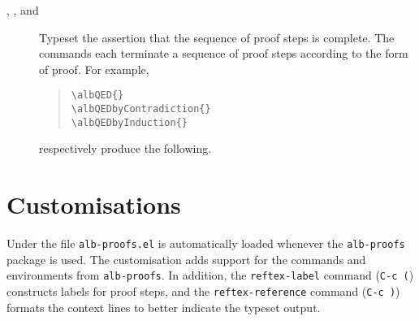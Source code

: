 \documentclass[11pt,a4paper,oneside,titlepage]{alb-latex}
\begin{document}
\begin{description}
\item[, , and
  ] Typeset the assertion that the sequence
  of proof steps is complete.  The commands each terminate a sequence of
  proof steps according to the form of proof.  For example,
  \begin{quote}
\begin{verbatim}
\albQED{}
\albQEDbyContradiction{}
\albQEDbyInduction{}
\end{verbatim}
  \end{quote}
  respectively produce the following.
  \begin{quote}
    \albQED{}
    \albQEDbyContradiction{}
    \albQEDbyInduction{}
  \end{quote}
\end{description}




\section{\AUCTeX{} Customisations}
\label{sec:alb-proofs-documentation:auctex-cust}

Under \AUCTeX{} the file \texttt{alb-proofs.el} is automatically loaded
whenever the \texttt{alb-proofs} package is used.  The customisation
adds support for the commands and environments from \texttt{alb-proofs}.
In addition, the \texttt{reftex-label} command (\texttt{C-c (})
constructs labels for proof steps, and the \texttt{reftex-reference}
command (\texttt{C-c )}) formats the context lines to better indicate
the typeset output.






\end{document}
